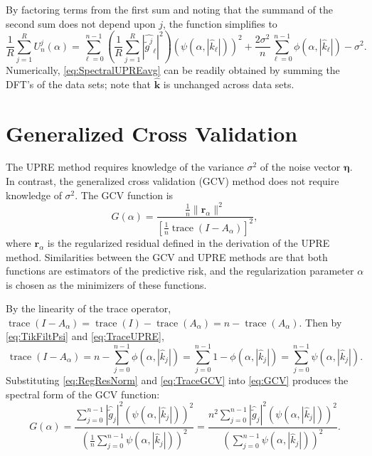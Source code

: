 \documentclass[12pt]{book}
\newcommand{\gnoise}{\widetilde{g}}	%
\newcommand{\kVec}{\mathbf{k}}	%
\DeclareMathOperator{\trace}{trace}		%
\newcommand{\regparam}{\alpha}
\newcommand{\filt}{\phi}
\newcommand{\mfilt}{\psi}
\newcommand{\noise}{\eta}	%
\newcommand{\noiseSD}{\sigma}	%
\newcommand{\noiseVec}{\bm{\noise}}	%
\newcommand{\regres}{\mathbf{r}_{\regparam}}	%
\newcommand{\A}{A_{\regparam}}	%
\newcommand{\U}{U}	%
\newcommand{\GCV}{G}	%
\begin{document}
By factoring terms from the first sum and noting that the summand of the second sum does not depend upon $j$, the function simplifies to
\begin{equation}
\frac{1}{R}\sum_{j=1}^R \U_n^j(\regparam) =  \sum_{\ell = 0}^{n-1} \left(\frac{1}{R}\sum_{j=1}^R |\widehat{\gnoise^j}_\ell|^2\right)(\mfilt(\regparam,|\widehat{k}_\ell|))^2 + \frac{2\noiseSD^2}{n}\sum_{\ell = 0}^{n-1} \filt(\regparam,|\widehat{k}_\ell|) - \noiseSD^2.
\label{eq:SpectralUPREavg}
\end{equation}
Numerically, \eqref{eq:SpectralUPREavg} can be readily obtained by summing the DFT's of the data sets; note that $\widehat{\kVec}$ is unchanged across data sets.

\section{Generalized Cross Validation} \label{sec:Generalized Cross Validation}
The UPRE method requires knowledge of the variance $\noiseSD^2$ of the noise vector $\noiseVec$. In contrast, the generalized cross validation (GCV) method does not require knowledge of $\noiseSD^2$. The GCV function is
\begin{equation}
\label{eq:GCV}
\GCV(\regparam) = \frac{\frac{1}{n}\|\regres\|^2}{\left[\frac{1}{n}\trace(I-\A)\right]^2},
\end{equation}
where $\regres$ is the regularized residual defined in the derivation of the UPRE method. Similarities between the GCV and UPRE methods are that both functions are estimators of the predictive risk, and the regularization parameter $\regparam$ is chosen as the minimizers of these functions. \par 
By the linearity of the trace operator, $\trace(I-\A) = \trace(I)-\trace(\A) = n - \trace(\A)$. Then by \eqref{eq:TikFiltPsi} and \eqref{eq:TraceUPRE},
\begin{equation}
\trace(I-\A) = n - \sum_{j = 0}^{n-1} \filt(\regparam,|\widehat{k}_j|) = \sum_{j = 0}^{n-1} 1 - \filt(\regparam,|\widehat{k}_j|) = \sum_{j = 0}^{n-1} \mfilt(\regparam,|\widehat{k}_j|).
\label{eq:TraceGCV}
\end{equation}
Substituting \eqref{eq:RegResNorm} and \eqref{eq:TraceGCV} into \eqref{eq:GCV} produces the spectral form of the GCV function:
\begin{equation}
\GCV(\regparam) = \frac{\sum_{j = 0}^{n-1} |\widehat{\gnoise}_j|^2(\mfilt(\regparam,|\widehat{k}_j|))^2}{(\frac{1}{n}\sum_{j = 0}^{n-1} \mfilt(\regparam,|\widehat{k}_j|))^2} = \frac{n^2\sum_{j = 0}^{n-1} |\widehat{\gnoise}_j|^2(\mfilt(\regparam,|\widehat{k}_j|))^2}{(\sum_{j = 0}^{n-1} \mfilt(\regparam,|\widehat{k}_j|))^2}.
\label{eq:SpectralGCV}
\end{equation} \par 
\end{document}
